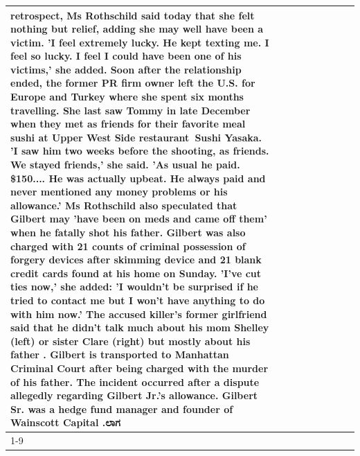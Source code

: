 \begin{table}[H]
\begin{tabular}{lllrlllll}
retrospect, Ms Rothschild said today that she felt nothing but relief, adding she may well have been a victim. 'I feel extremely lucky. He kept texting me. I feel so lucky. I feel I could have been one of his victims,' she added. Soon after the relationship ended, the former PR firm owner left the U.S. for Europe and Turkey where she spent six months  travelling. She last saw Tommy in late December when they met as friends for their favorite meal sushi at Upper West Side restaurant Sushi Yasaka. 'I saw him two weeks before the shooting, as friends. We stayed friends,' she said. 'As usual he paid. \$150.... He was actually upbeat. He always paid and never mentioned any money problems or his allowance.' Ms Rothschild also speculated that Gilbert may 'have been on meds and came off them' when he fatally shot his father. Gilbert was also charged with 21 counts of criminal possession of forgery devices after skimming device and 21 blank credit cards found at his home on Sunday. 'I've cut ties now,' she added: 'I wouldn’t be surprised if he tried to contact me but I won’t have anything to do with him now.' The accused killer's former girlfriend said that he didn't talk much about his mom Shelley (left) or sister Clare (right) but mostly about his father . Gilbert is transported to Manhattan Criminal Court  after being charged with the murder of his father. The incident occurred after a dispute allegedly regarding Gilbert Jr.'s allowance. Gilbert Sr. was a hedge fund manager and founder of Wainscott Capital .ಲಾಗ \\
\cline{1-9} \cline{2-9}

\end{tabular}
\end{table}
